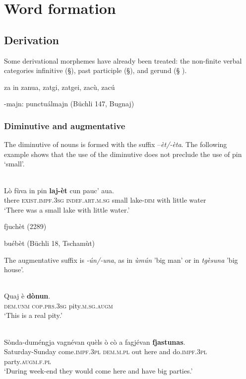 \chapter{Word formation}

\section{Derivation}
Some derivational morphemes have already been treated: the non-finite verbal categories infinitive (§), past participle (§), and gerund (§ ).


za in zanua, zatgi, zatgei, zacù, zacú

-majn: punctuálmajn (Büchli 147, Bugnaj)


\subsection{Diminutive and augmentative}
The diminutive of nouns is formed with the suffix –\textit{èt/-èta}. The following example shows that the use of the diminutive does not preclude the use of pin `small'.

\ea\label{}
\\
\gll    Lò fùva in pin \textbf{laj-èt} cun pauc’ aua.\\
     there \textsc{exist.impf.3sg} \textsc{indef.art.m.sg} small lake-\textsc{dim} with little water \\
\glt `There was a small lake with little water.'
\z


fjuchèt (2289)

buébèt (Büchli 18, Tschamùt)

The augmentative suffix is \textit{-ún/-una}, as in \textit{ùmún} 'big man' or in \textit{tgèsuna} 'big house'.

\ea
\label{}
\\
\gll  Quaj è \textbf{dònun}. \\
\textsc{dem.unm} \textsc{cop.prs.3sg} pity.\textsc{m.sg.augm}\\
\glt `This is a real pity.'
\z

\ea
\label{}
\\
\gll Sònda-duméngja vagnévan quèls ò cò a fagjévan \textbf{fjastunas}.\\
Saturday-Sunday come.\textsc{impf.3pl} \textsc{dem.m.pl} out here and do.\textsc{impf.3pl} party.\textsc{augm.f.pl}\\
\glt `During week-end they would come here and have big parties.'
\z

